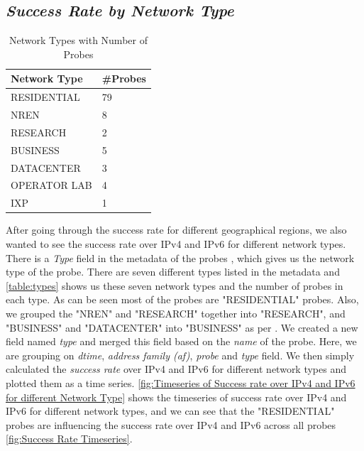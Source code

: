 \subsection*{\textit{Success Rate by Network Type}}
\begin{table}[!h]
	\centering
	\caption{Network Types with Number of Probes}
	\label{table:regions}
	\begin{tabular}{lp{2cm}}
  		\toprule
  		\textbf{Network Type} & \textbf{\#Probes} \\ 
  		\midrule
  		RESIDENTIAL & 79 \\ 
  		NREN & 8 \\
  		RESEARCH & 2 \\
  		BUSINESS & 5 \\
		DATACENTER & 3 \\
  		OPERATOR LAB & 4 \\
		IXP & 1 \\
  		\bottomrule
\end{tabular}
\end{table}

After going through the success rate for different geographical regions, we also wanted to see the success rate over IPv4 and IPv6 for different network types. 
There is a \textit{Type} field in the metadata of the probes \cite{metadata}, which
gives us the network type of the probe. There are seven different types listed in the metadata and \cref{table:types} shows us these seven network types and the 
number of probes in each type. As can be seen most of the probes are "RESIDENTIAL" probes.
Also, we grouped the "NREN" and "RESEARCH" together into "RESEARCH", and "BUSINESS" and "DATACENTER" into "BUSINESS" as per \cite{bajpaimeasuring}. We created a 
new field named \textit{type} and merged this field based on the \textit{name} of the probe.
Here, we are grouping on \textit{dtime}, \textit{address family (af)}, \textit{probe} and \textit{type} field. We then simply calculated the \textit{success rate} 
over IPv4 and IPv6 for different network types and plotted them as a time series. \cref{fig:Timeseries of Success rate over IPv4 and IPv6 for different Network Type} shows
the timeseries of success rate over IPv4 and IPv6 for different network types, and we can see that the "RESIDENTIAL" probes are influencing the success rate over 
IPv4 and IPv6 across all probes \cref{fig:Success Rate Timeseries}.

